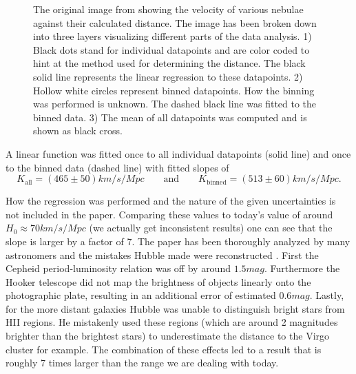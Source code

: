 \begin{figure}[H]
	\caption{The original image from \autocite{Hubble1929} showing the velocity of various nebulae against their calculated distance. The image has been broken down into three layers visualizing different parts of the data analysis. 1) Black dots stand for individual datapoints and are color coded to hint at the method used for determining the distance. The black solid line represents the linear regression to these datapoints. 2) Hollow white circles represent binned datapoints. How the binning was performed is unknown. The dashed black line was fitted to the binned data. 3) The mean of all datapoints was computed and is shown as black cross.}
	\label{fig:hubble}
\end{figure}

A linear function was fitted once to all individual datapoints (solid line) and once to the binned data (dashed line) with fitted slopes of 
\begin{equation*}
	K_{\text{all}} = (465 \pm 50) \unit{km/s/Mpc} \qquad\text{and}\qquad K_{\text{binned}} = (513 \pm 60) \unit{km/s/Mpc}.
\end{equation*}

How the regression was performed and the nature of the given uncertainties is not included in the paper. Comparing these values to today's value of around \( H_0 \approx 70 \unit{km/s/Mpc} \) \autocite{Di_Valentino_2021, kamionkowski2023hubble} (we actually get inconsistent results) one can see that the slope is larger by a factor of 7. The paper has been thoroughly analyzed by many astronomers and the mistakes Hubble made were reconstructed \autocite{blunder}. First the Cepheid period-luminosity relation was off by around \( 1.5 \unit{mag} \). Furthermore the Hooker telescope did not map the brightness of objects linearly onto the photographic plate, resulting in an additional error of estimated \( 0.6 \unit{mag} \). Lastly, for the more distant galaxies Hubble was unable to distinguish bright stars from HII regions. He mistakenly used these regions (which are around 2 magnitudes brighter than the brightest stars) to underestimate the distance to the Virgo cluster for example. The combination of these effects led to a result that is roughly 7 times larger than the range we are dealing with today.

